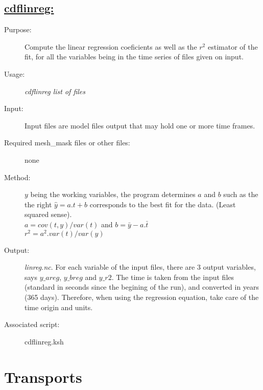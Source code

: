 \documentclass[a4paper,11pt]{article}
\begin{document}
\newpage
\subsection*{\underline{cdflinreg:}}
\begin{description}
\item[Purpose:] Compute the linear regression coeficients as well as the $r^2$ estimator of the fit, for all the variables 
  being in the time series of files given on input.
\item[Usage:] {\em cdflinreg list of files }
\item[Input:] Input files are model files output that may hold one or more time frames. 
\item[Required mesh\_mask files or other files:]  none
\item[Method:] $y$ being the working variables, the program determines $a$ and $b$ such as the the right $\hat{y}=a.t+b$ corresponds 
to the best fit for the data. (Least squared sense). \\
    $a=cov(t,y)/var(t)$ and $b=\bar{y} - a . \bar{t}$ \\
    $r^2=a^2.var(t)/var(y)$
\item[Output:] {\em linreg.nc}. For each variable of the input files, there are 3 output variables, says $y\_areg$, $y\_breg$ and
     $y\_r2$. The time is taken from the input files (standard in seconds since the begining of the run), and converted in years 
     (365 days). Therefore, when using the regression equation, take care of the time origin and units.
\item[Associated script:] cdflinreg.ksh
\end{description}



\newpage
\section{Transports}
\end{document}

